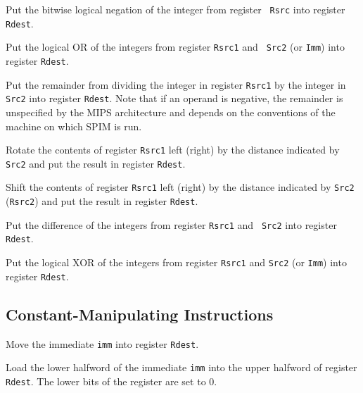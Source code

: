 \documentclass[11pt]{article}
\begin{document}
Put the bitwise logical negation of the integer from register {\tt
Rsrc} into register {\tt Rdest}.

Put the logical OR of the integers from register {\tt Rsrc1} and {\tt
Src2} (or {\tt Imm}) into register {\tt Rdest}.

Put the remainder from dividing the integer in register {\tt Rsrc1} by
the integer in {\tt Src2} into register {\tt Rdest}.  Note that if an
operand is negative, the remainder is unspecified by the MIPS
architecture and depends on the conventions of the machine on which
SPIM is run.

Rotate the contents of register {\tt Rsrc1} left (right) by the
distance indicated by {\tt Src2} and put the result in register
{\tt Rdest}.

Shift the contents of register {\tt Rsrc1} left (right) by the
distance indicated by {\tt Src2} ({\tt Rsrc2}) and put the
result in register {\tt Rdest}.

Put the difference of the integers from register {\tt Rsrc1} and {\tt
Src2} into register {\tt Rdest}.

Put the logical XOR of the integers from register {\tt Rsrc1} and
{\tt Src2} (or {\tt Imm}) into register {\tt Rdest}.


\subsection {Constant-Manipulating Instructions}

Move the immediate {\tt imm} into register {\tt Rdest}.

Load the lower halfword of the immediate {\tt imm} into the upper
halfword of register {\tt Rdest}.  The lower bits of the register are
set to 0.
\end{document}
